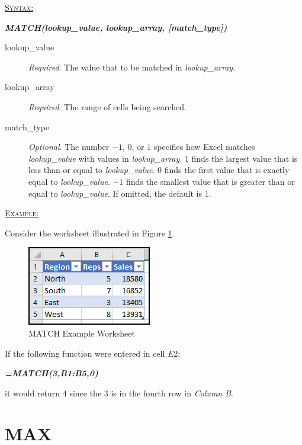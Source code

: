\begin{addmargin}[1cm]{0cm}
	
	\medskip
	\underline{\textsc{Syntax:}}
	\medskip
	
	{\color{Syntax}
		\noindent\textbf{\textit{MATCH(lookup\_value, lookup\_array, [match\_type])}}
	}
	
	\begin{description}
		\item[lookup\_value] \textit{Required}. The value that to be matched in \textit{lookup\_array}.
		\item[lookup\_array] \textit{Required}. The range of cells being searched.
		\item[match\_type] \textit{Optional}. The number $ -1 $, $ 0 $, or $ 1 $ specifies how Excel matches \textit{lookup\_value} with values in \textit{lookup\_array}. $ 1 $ finds the largest value that is less than or equal to \textit{lookup\_value}. $ 0 $ finds the first value that is exactly equal to \textit{lookup\_value}. $ -1 $ finds the smallest value that is greater than or equal to \textit{lookup\_value}. If omitted, the default is $ 1 $.
	\end{description}

	\medskip
	\noindent\underline{\textsc{Example:}}
	\medskip
	
	\noindent Consider the worksheet illustrated in Figure \ref{apa:mat}.
	
	\begin{figure}[H]
		\centering
		\includegraphics[width=\maxwidth{.45\linewidth}]{gfx/apa_fig01}
		\caption{MATCH Example Worksheet}
		\label{apa:mat}
	\end{figure}
	
	\noindent If the following function were entered in cell $ E2 $:
	
	{\color{Syntax}
		\textit{\textbf{=MATCH(3,B1:B5,0)}}
	}
	
	\noindent it would return $ 4 $ since the $ 3 $ is in the fourth row in \textit{Column B}.

\end{addmargin}

\section{MAX}

